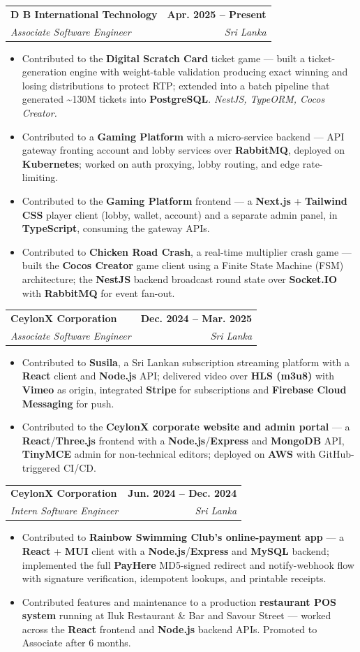 \documentclass[letterpaper,10pt]{article}
\makeatletter
\newcommand{\resumeItem}[1]{
  \item\small{{#1 \vspace{-1pt}}}
}
\newcommand{\resumeSubheading}[4]{
  \vspace{1pt}\item
    \begin{tabular*}{1.0\textwidth}[t]{l@{\extracolsep{\fill}}r}
      \textbf{#1} & \textbf{\small #2} \\
      \textit{\small#3} & \textit{\small #4} \\
    \end{tabular*}\vspace{-5pt}
}
\newcommand{\resumeItemListStart}{\begin{itemize}}
\newcommand{\resumeItemListEnd}{\end{itemize}\vspace{-4pt}}
\makeatother
\begin{document}
    \resumeSubheading
      {D B International Technology}{Apr. 2025 -- Present}
      {Associate Software Engineer}{Sri Lanka}
      \resumeItemListStart
        \resumeItem{Contributed to the \textbf{Digital Scratch Card} ticket game --- built a ticket-generation engine with weight-table validation producing exact winning and losing distributions to protect RTP; extended into a batch pipeline that generated \textasciitilde{}130M tickets into \textbf{PostgreSQL}. \emph{NestJS, TypeORM, Cocos Creator.}}
        \resumeItem{Contributed to a \textbf{Gaming Platform} with a micro-service backend --- API gateway fronting account and lobby services over \textbf{RabbitMQ}, deployed on \textbf{Kubernetes}; worked on auth proxying, lobby routing, and edge rate-limiting.}
        \resumeItem{Contributed to the \textbf{Gaming Platform} frontend --- a \textbf{Next.js} + \textbf{Tailwind CSS} player client (lobby, wallet, account) and a separate admin panel, in \textbf{TypeScript}, consuming the gateway APIs.}
        \resumeItem{Contributed to \textbf{Chicken Road Crash}, a real-time multiplier crash game --- built the \textbf{Cocos Creator} game client using a Finite State Machine (FSM) architecture; the \textbf{NestJS} backend broadcast round state over \textbf{Socket.IO} with \textbf{RabbitMQ} for event fan-out.}
      \resumeItemListEnd

    \resumeSubheading
      {CeylonX Corporation}{Dec. 2024 -- Mar. 2025}
      {Associate Software Engineer}{Sri Lanka}
      \resumeItemListStart
        \resumeItem{Contributed to \textbf{Susila}, a Sri Lankan subscription streaming platform with a \textbf{React} client and \textbf{Node.js} API; delivered video over \textbf{HLS (m3u8)} with \textbf{Vimeo} as origin, integrated \textbf{Stripe} for subscriptions and \textbf{Firebase Cloud Messaging} for push.}
        \resumeItem{Contributed to the \textbf{CeylonX corporate website and admin portal} --- a \textbf{React}/\textbf{Three.js} frontend with a \textbf{Node.js}/\textbf{Express} and \textbf{MongoDB} API, \textbf{TinyMCE} admin for non-technical editors; deployed on \textbf{AWS} with GitHub-triggered CI/CD.}
      \resumeItemListEnd

    \resumeSubheading
      {CeylonX Corporation}{Jun. 2024 -- Dec. 2024}
      {Intern Software Engineer}{Sri Lanka}
      \resumeItemListStart
        \resumeItem{Contributed to \textbf{Rainbow Swimming Club's online-payment app} --- a \textbf{React} + \textbf{MUI} client with a \textbf{Node.js}/\textbf{Express} and \textbf{MySQL} backend; implemented the full \textbf{PayHere} MD5-signed redirect and notify-webhook flow with signature verification, idempotent lookups, and printable receipts.}
        \resumeItem{Contributed features and maintenance to a production \textbf{restaurant POS system} running at Iluk Restaurant \& Bar and Savour Street --- worked across the \textbf{React} frontend and \textbf{Node.js} backend APIs. Promoted to Associate after 6 months.}
      \resumeItemListEnd
\end{document}
